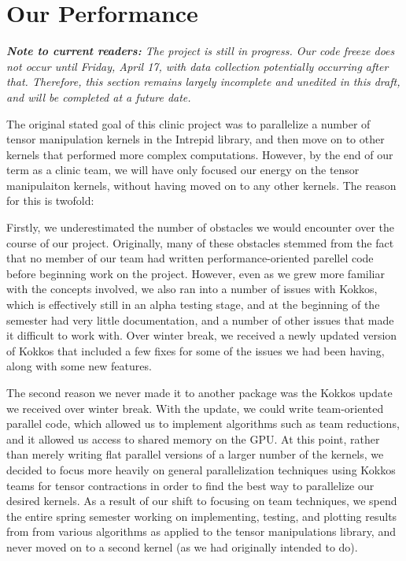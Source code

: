
\chapter{Our Performance}

\textit{\textbf{Note to current readers:} The project is still in progress. Our code freeze does not occur
until Friday, April 17, with data collection potentially occurring after that. Therefore, this section remains 
largely incomplete and unedited in this draft, and will be completed at a future date.}

The original stated goal of this clinic project was to parallelize a number of tensor manipulation 
kernels in the Intrepid library, and then move on to other kernels that performed more complex 
computations. However, by the end of our term as a clinic team, we will have only focused our 
energy on the tensor manipulaiton kernels, without having moved on to any other kernels. The 
reason for this is twofold:

Firstly, we underestimated the number of obstacles we would encounter over the course of our project. 
Originally, many of these obstacles stemmed from the fact that no member of our team had written 
performance-oriented parellel code before beginning work on the project. However, even as we grew more 
familiar with the concepts involved, we also ran into a number of issues with Kokkos, which is effectively 
still in an alpha testing stage, and at the beginning of the semester had very little documentation, and 
a number of other issues that made it difficult to work with. Over winter break, we received a newly updated 
version of Kokkos that included a few fixes for some of the issues we had been having, along with some new 
features.

The second reason we never made it to another package was the Kokkos update we received over winter break.
With the update, we could write team-oriented parallel code, which allowed us to implement algorithms such as
team reductions, and it allowed us access to shared memory on the GPU. At this point, rather than merely writing 
flat parallel versions of a larger number of the kernels, we decided to focus more heavily on general parallelization
techniques using Kokkos teams for tensor contractions in order to find the best way to parallelize our desired kernels.
As a result of our shift to focusing on team techniques, we spend the entire spring semester working on 
implementing, testing, and plotting results from from various algorithms as applied to the tensor manipulations library, 
and never moved on to a second kernel (as we had originally intended to do).
